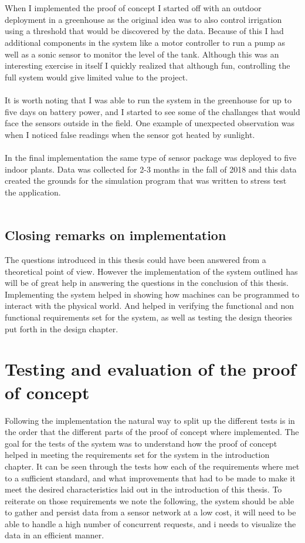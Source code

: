 \documentclass[]{uiophd}
\begin{document}
\\\\
When I implemented the proof of concept I started off with an outdoor deployment in a greenhouse as the original idea was to also control irrigation using a threshold that would be discovered by the data. Because of this I had additional components in the system like a motor controller to run a pump as well as a sonic sensor to monitor the level of the tank. Although this was an interesting exercise in itself I quickly realized that although fun, controlling the full system would give limited value to the project.
\\\\
It is worth noting that I was able to run the system in the greenhouse for up to five days on battery power, and I started to see some of the challanges that would face the sensors outside in the field. One example of unexpected observation was when I noticed false readings when the sensor got heated by sunlight. 
\\\\
In the final implementation the same type of sensor package was deployed to five indoor plants. Data was collected for 2-3 months in the fall of 2018 and this data created the grounds for the simulation program that was written to stress test the application.
\\\\
\section{Closing remarks on implementation}
The questions introduced in this thesis could have been answered from a theoretical point of view. However the implementation of the system outlined has will be of great help in answering the questions in the conclusion of this thesis. Implementing the system helped in showing how machines can be programmed to interact with the physical world. And helped in verifying the functional and non functional requirements set for the system, as well as testing the design theories put forth in the design chapter. 

\chapter{Testing and evaluation of the proof of concept}
Following the implementation the natural way to split up the different tests is in the order that the different parts of the proof of concept where implemented. The goal for the tests of the system was to understand how the proof of concept helped in meeting the requirements set for the system in the introduction chapter. It can be seen through the tests how each of the requirements where met to a sufficient standard, and what improvements that had to be made to make it meet the desired characteristics laid out in the introduction of this thesis. To reiterate on those requirements we note the following, the system should be able to gather and persist data from a sensor network at a low cost, it will need to be able to handle a high number of concurrent requests, and i needs to visualize the data in an efficient manner.
\end{document}
